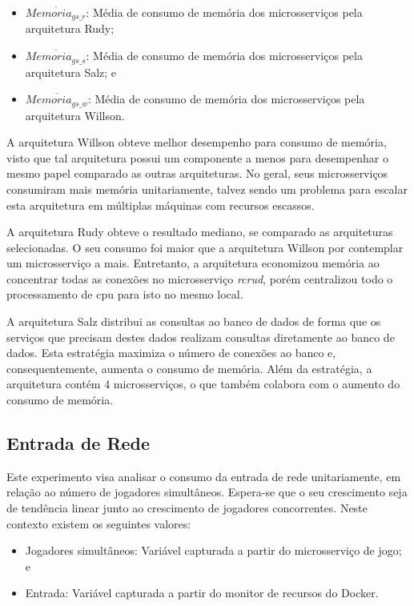 \begin{itemize}
\item $\overline{Memoria_{gs\_r}}$: Média de consumo de memória dos microsserviços pela arquitetura Rudy;
\item $\overline{Memoria_{gs\_s}}$: Média de consumo de memória dos microsserviços pela arquitetura Salz; e
\item $\overline{Memoria_{gs\_w}}$: Média de consumo de memória dos microsserviços pela arquitetura Willson.
\end{itemize}

A arquitetura Willson obteve melhor desempenho para consumo de memória, visto que tal arquitetura possui um componente a menos para desempenhar o mesmo papel comparado as outras arquiteturas.
%
No geral, seus microsserviços consumiram mais memória unitariamente, talvez sendo um problema para escalar esta arquitetura em múltiplas máquinas com recursos escassos.

A arquitetura Rudy obteve o resultado mediano, se comparado as arquiteturas selecionadas.
%
O seu consumo foi maior que a arquitetura Willson por contemplar um microsserviço a mais.
%
Entretanto, a arquitetura economizou memória ao concentrar todas as conexões no microsserviço \textit{rcrud}, porém centralizou todo o processamento de \ac{cpu} para isto no mesmo local.

A arquitetura Salz distribui as consultas ao banco de dados de forma que os serviços que precisam destes dados realizam consultas diretamente ao banco de dados.
%
Esta estratégia maximiza o número de conexões ao banco e, consequentemente, aumenta o consumo de memória.
%
Além da estratégia, a arquitetura contém 4 microsserviços, o que também colabora com o aumento do consumo de memória.


\subsection{Entrada de Rede}

Este experimento visa analisar o consumo da entrada de rede unitariamente, em relação ao número de jogadores simultâneos.
%
Espera-se que o seu crescimento seja de tendência linear junto ao crescimento de jogadores concorrentes.
%
Neste contexto existem os seguintes valores:

\begin{itemize}
    \item Jogadores simultâneos: Variável capturada a partir do microsserviço de jogo; e
    \item Entrada: Variável capturada a partir do monitor de recursos do Docker.
\end{itemize}

